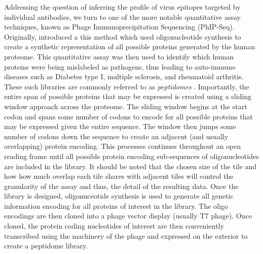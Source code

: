 \documentclass{article}
\begin{document}
Addressing the question of inferring the profile of virus epitopes targeted by individual antibodies, we turn to one of the more notable quantitative assay techniques, known as Phage Immunoprecipitation Sequencing (PhIP-Seq).
Originally, \citet{Larman2011} introduced a this method which used oligonucleotide synthesis to create a synthetic representation of all possible proteins generated by the human proteome.
This quantitative assay was then used to identify which human proteins were being mislabeled as pathogens, thus leading to auto-immune diseases such as Diabetes type I, multiple sclerosis, and rheumatoid arthritis.
These such libraries are commonly referred to as \textit{peptidomes} \citep{Mohan2018}.
Importantly, the entire span of possible proteins that may be expressed is created using a sliding window approach across the proteome.
The sliding window begins at the start codon and spans some number of codons to encode for all possible proteins that may be expressed given the entire sequence.
The window then jumps some number of codons down the sequence to create an adjacent (and usually overlapping) protein encoding.
This processes continues throughout an open reading frame until all possible protein encoding sub-sequences of oligonucleotides are included in the library.
It should be noted that the chosen size of the tile and how how much overlap each tile shares with adjacent tiles will control the granularity of the assay and thus, the detail of the resulting data.
Once the library is designed, oligonuceotide synthesis is used to generate all genetic information encoding for all proteins of interest in the library.
The oligo encodings are then cloned into a phage vector display (usually T7 phage).
Once cloned, the protein coding nucleotides of interest are then conveniently transcribed using the machinery of the phage and expressed on the exterior to create a peptidome library.
\end{document}
